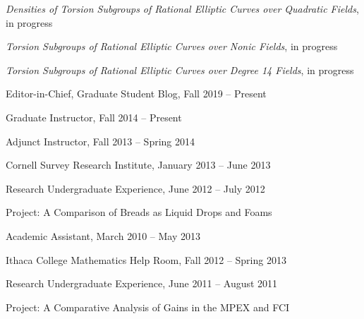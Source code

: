  
\begin{enumDiamond}[itemsep=0.1cm]
\item {\itshape Densities of Torsion Subgroups of Rational Elliptic Curves over Quadratic Fields}, in progress

\item {\itshape Torsion Subgroups of Rational Elliptic Curves over Nonic Fields}, in progress

\item {\itshape Torsion Subgroups of Rational Elliptic Curves over Degree 14 Fields}, in progress
\end{enumDiamond} \twomedskip\twomedskip
 
 
 
 
 
 
 


 \twomedskip\twomedskip




 

Editor-in-Chief, Graduate Student Blog, Fall 2019 -- Present \twomedskip

Graduate Instructor, Fall 2014 -- Present \twomedskip

Adjunct Instructor, Fall 2013 -- Spring 2014 \twomedskip

Cornell Survey Research Institute, January 2013 -- June 2013 \twomedskip

Research Undergraduate Experience, June 2012 -- July 2012 \par
Project: A Comparison of Breads as Liquid Drops and Foams \twomedskip

Academic Assistant, March 2010 -- May 2013 \par
Ithaca College Mathematics Help Room, Fall 2012 -- Spring 2013 \par
Research Undergraduate Experience, June 2011 -- August 2011 \par
Project: A Comparative Analysis of Gains in the MPEX and FCI \twomedskip\twomedskip





